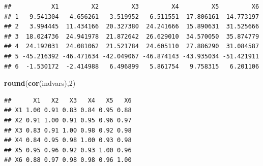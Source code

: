 \documentclass[
]{book}
\newenvironment{Shaded}{\begin{snugshade}}{\end{snugshade}}
\newcommand{\AttributeTok}[1]{\textcolor[rgb]{0.13,0.29,0.53}{#1}}
\newcommand{\DecValTok}[1]{\textcolor[rgb]{0.00,0.00,0.81}{#1}}
\newcommand{\FloatTok}[1]{\textcolor[rgb]{0.00,0.00,0.81}{#1}}
\newcommand{\FunctionTok}[1]{\textcolor[rgb]{0.13,0.29,0.53}{\textbf{#1}}}
\newcommand{\NormalTok}[1]{#1}
\newcommand{\OtherTok}[1]{\textcolor[rgb]{0.56,0.35,0.01}{#1}}
\newcommand{\SpecialCharTok}[1]{\textcolor[rgb]{0.81,0.36,0.00}{\textbf{#1}}}
\begin{document}
\begin{verbatim}
##           X1         X2         X3         X4         X5         X6
## 1   9.541304   4.656261   3.519952   6.511551  17.806161  14.773197
## 2   3.994445  11.434166  20.327380  24.241666  15.890631  31.525666
## 3  18.024736  24.941978  21.872642  26.629010  34.570050  35.874779
## 4  24.192031  24.081062  21.521784  24.605110  27.886290  31.084587
## 5 -45.216392 -46.471634 -42.049067 -46.874143 -43.935034 -51.421911
## 6  -1.530172  -2.414988   6.496899   5.861754   9.758315   6.201106
\end{verbatim}

\begin{Shaded}
\begin{Highlighting}[]
\FunctionTok{round}\NormalTok{(}\FunctionTok{cor}\NormalTok{(indvars),}\DecValTok{2}\NormalTok{)}
\end{Highlighting}
\end{Shaded}

\begin{verbatim}
##      X1   X2   X3   X4   X5   X6
## X1 1.00 0.91 0.83 0.84 0.95 0.88
## X2 0.91 1.00 0.91 0.95 0.96 0.97
## X3 0.83 0.91 1.00 0.98 0.92 0.98
## X4 0.84 0.95 0.98 1.00 0.93 0.98
## X5 0.95 0.96 0.92 0.93 1.00 0.96
## X6 0.88 0.97 0.98 0.98 0.96 1.00
\end{verbatim}

\begin{Shaded}
\end{Shaded}
\end{document}
